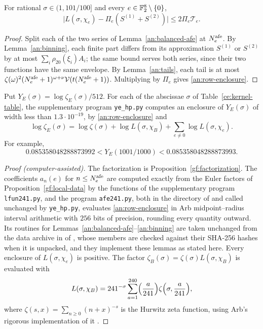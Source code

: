 \begin{lemma}\label{an:row}
For rational $\sigma\in(1,101/100]$ and every $e\in\mathbb F_2^8\setminus\{0\}$,
\begin{equation}\label{an:row-enclosure}
 \bigl|L(\sigma,\chi_e)-\Pi_e(S^{(1)}+S^{(2)})\bigr|
 \le2\Pi_e\mathcal T_e.
\end{equation}
\end{lemma}

\begin{proof}
Split each of the two series of Lemma~\ref{an:balanced-afe} at
$N^{\rm afe}_e$. By Lemma~\ref{an:binning}, each finite part differs from its
approximation $S^{(1)}$ or $S^{(2)}$ by at most $\sum_i\rho_{20}(\xi_i)A_i$; the
same bound serves both series, since their two functions have the same
envelope. By Lemma~\ref{an:tails}, each tail is at most
$\zeta(\omega)^2(N^{\rm afe}_e+1)^{\omega+\nu}\mathcal V(t(N^{\rm afe}_e+1))$. Multiplying by
$\Pi_e$ gives \eqref{an:row-enclosure}.
\end{proof}

\begin{proposition}\label{an:genus-value}
Put $Y_E(\sigma)=\log\zeta_E(\sigma)/512$. For each of the abscissae
$\sigma$ of Table~\ref{ce:kernel-table}, the supplementary program
\texttt{ye\_hp.py} computes an enclosure of $Y_E(\sigma)$ of width less than
$1.3\cdot10^{-19}$, by \eqref{an:row-enclosure} and
\[
 \log\zeta_E(\sigma)=\log\zeta(\sigma)+\log L(\sigma,\chi_B)
 +\sum_{e\ne0}\log L(\sigma,\chi_e).
\]
For example,
\[
 0.085358048288873992<Y_E(1001/1000)<0.085358048288873993.
\]
\end{proposition}

\begin{proof}[Proof (computer-assisted)]
The factorization is Proposition~\ref{gf:factorization}. The coefficients
$a_n(e)$ for $n\le N^{\rm afe}_e$ are computed exactly from the Euler factors of
Proposition~\ref{gf:local-data} by the functions of the supplementary program
\texttt{lfun241.py}, and the program \texttt{afe241.py}, both in the
directory  of \cite{NaslundCode4317} and
called unchanged by \texttt{ye\_hp.py}, evaluates
\eqref{an:row-enclosure} in Arb midpoint--radius interval arithmetic
\cite{Johansson2017,FLINT} with $256$ bits of precision, rounding every
quantity outward. Its routines for
Lemmas~\ref{an:balanced-afe}--\ref{an:binning} are taken unchanged from the
data archive in  of
\cite{NaslundCode4317}, whose members are checked against their SHA-256
hashes when it is unpacked, and they implement these lemmas as stated here. Every enclosure of
$L(\sigma,\chi_e)$ is positive. The factor $\zeta_B(\sigma)=\zeta(\sigma)
L(\sigma,\chi_B)$ is evaluated with
\[
 L(\sigma,\chi_B)=241^{-\sigma}\sum_{a=1}^{240}\Bigl(\frac
 a{241}\Bigr)\zeta\Bigl(\sigma,\frac a{241}\Bigr),
\]
where $\zeta(s,x)=\sum_{n\ge0}(n+x)^{-s}$ is the Hurwitz zeta function,
using Arb's rigorous implementation of it \cite{Johansson2015Hurwitz}.
\end{proof}

